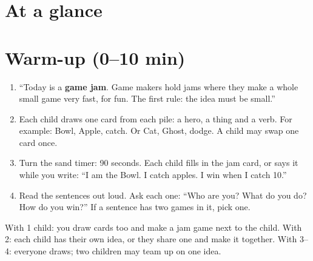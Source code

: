 \section{At a glance}
\begin{timeplan}
\end{timeplan}

\section{Warm-up (0--10 min)}
\begin{unplugged}
\begin{enumerate}[leftmargin=1.4em,itemsep=1pt]
  \item \enquote{Today is a \textbf{game jam}. Game makers hold jams where they make a whole small game very fast, for fun. The first rule: the idea must be small.}
  \item Each child draws one card from each pile: a hero, a thing and a verb. For example: Bowl, Apple, catch. Or Cat, Ghost, dodge. A child may swap one card once.
  \item Turn the sand timer: 90 seconds. Each child fills in the jam card, or says it while you write: \enquote{I am the Bowl. I catch apples. I win when I catch 10.}
  \item Read the sentences out loud. Ask each one: \enquote{Who are you? What do you do? How do you win?} If a sentence has two games in it, pick one.
\end{enumerate}
With 1 child: you draw cards too and make a jam game next to the child. With 2: each child has their own idea, or they share one and make it together. With 3--4: everyone draws; two children may team up on one idea.
\end{unplugged}

